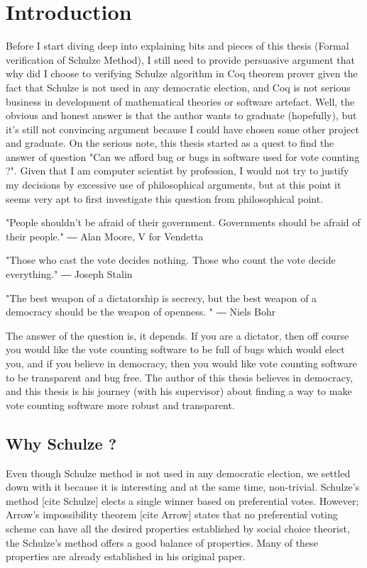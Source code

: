 \chapter{Introduction}
\label{cha:intro}
Before I start diving deep into explaining bits and pieces of this thesis (Formal verification of Schulze Method), 
I still need to provide persuasive  argument that why did I choose to verifying Schulze algorithm in Coq theorem 
prover given the fact that Schulze is not used in any democratic election, and Coq is not serious business in 
development of mathematical theories or software artefact.   Well, the obvious and  honest answer 
is that  the author wants to graduate (hopefully), but it's still not convincing argument because I could have chosen 
some other project and graduate.  On the serious note, this thesis started as a quest to 
find the answer of question  "Can we afford bug or bugs in software used for vote counting ?".  Given that I am 
computer scientist by profession, I would not try to justify my decisions by excessive use of philosophical 
arguments, but at this point it seems very apt to first investigate this question from philosophical point. 

"People shouldn't be afraid of their government. Governments should be afraid of their people."
― Alan Moore, V for Vendetta 


"Those who cast the vote decides nothing. Those who count the vote decide everything."
―  Joseph Stalin


"The best weapon of a dictatorship is secrecy, but the best weapon of a democracy should be the 
weapon of openness. " 
―   Niels Bohr

The answer of the question is, it depends. If you are a dictator, then off course you 
would like the vote counting software to be full of bugs which would elect you, and if you believe 
in democracy, then you would like vote counting software to be transparent and bug free.  The author 
of this thesis believes in democracy, and  this thesis is  his journey (with his supervisor) about finding 
a way to make vote counting software more robust and transparent.


\section{Why Schulze ?}
\label{sec:thesisstatement}
Even though Schulze method is not used in any democratic election, we settled down 
with it because it is interesting and at the same time, non-trivial.  Schulze's method [cite Schulze]  elects 
a single winner based on 
preferential votes.  However; Arrow's impossibility theorem [cite Arrow]  states that no preferential voting 
scheme can have all the desired properties established by  social choice theorist,
the Schulze's method offers a good balance of properties. Many of these properties are already 
established in his original paper.



